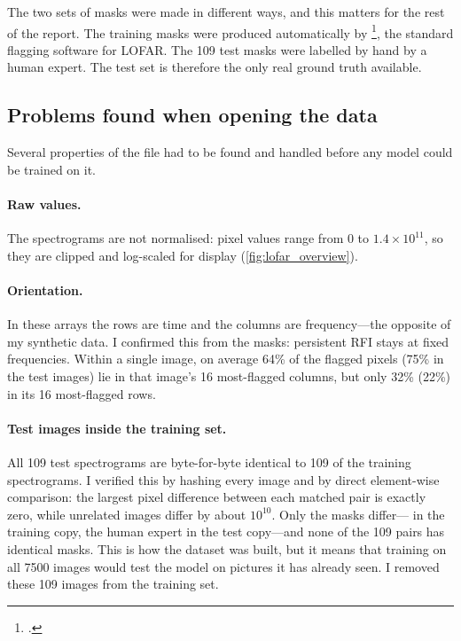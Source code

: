 The two sets of masks were made in different ways, and this matters for the
rest of the report. The training masks were produced automatically by
\aoflagger{}\footcite{offringa2012}, the standard flagging software for LOFAR.
The 109 test masks were labelled by hand by a human expert. The test set is
therefore the only real ground truth available.

\subsection{Problems found when opening the data}
\label{sec:lofar_audit}
Several properties of the file had to be found and handled before any model
could be trained on it.

\paragraph{Raw values.} The spectrograms are not normalised: pixel values range
from 0 to $1.4\times10^{11}$, so they are clipped and log-scaled for display
(\cref{fig:lofar_overview}).

\paragraph{Orientation.} In these arrays the rows are time and the columns are
frequency---the opposite of my synthetic data. I confirmed this from the masks:
persistent RFI stays at fixed frequencies. Within a single image, on average
64\% of the flagged pixels (75\% in the test images) lie in that image's 16
most-flagged columns, but only 32\% (22\%) in its 16 most-flagged rows.

\paragraph{Test images inside the training set.} All 109 test spectrograms are
byte-for-byte identical to 109 of the training spectrograms. I verified this
by hashing every image and by direct element-wise comparison: the largest
pixel difference between each matched pair is exactly zero, while unrelated
images differ by about $10^{10}$. Only the masks differ---\aoflagger{} in the
training copy, the human expert in the test copy---and none of the 109 pairs
has identical masks. This is how the dataset was built, but it means that
training on all 7500 images would test the model on pictures it has already
seen. I removed these 109 images from the training set.


